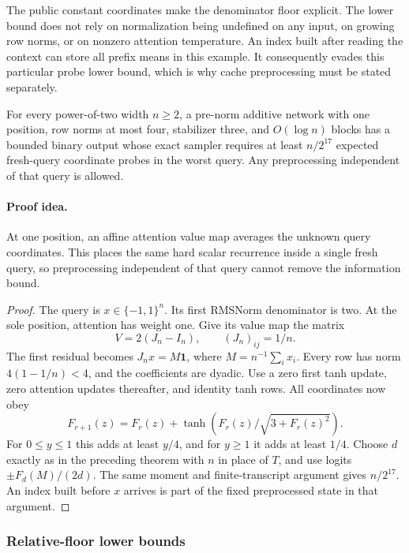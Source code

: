 The public constant coordinates make the denominator floor explicit.
The lower bound does not rely on normalization being undefined on any
input, on growing row norms, or on nonzero attention temperature. An
index built after reading the context can store all prefix means in this
example. It consequently evades this particular probe lower bound,
which is why cache preprocessing must be stated separately.


\begin{corollary}
\label{cor:pn-fresh-query}
For every power-of-two width $n\ge2$, a pre-norm additive network with
one position, row norms at most four, stabilizer three, and
$O(\log n)$ blocks has a bounded binary output whose exact sampler
requires at least $n/2^{17}$ expected fresh-query coordinate probes in
the worst query. Any preprocessing independent of that query is allowed.
\end{corollary}
\paragraph{Proof idea.}
At one position, an affine attention value map averages the unknown
query coordinates. This places the same hard scalar recurrence inside a
single fresh query, so preprocessing independent of that query cannot
remove the information bound.

\begin{proof}
The query is $x\in\{-1,1\}^n$. Its first RMSNorm denominator is two.
At the sole position, attention has weight one. Give its value map the
matrix
\[
 V=2(J_n-I_n),\qquad (J_n)_{ij}=1/n.
\]
The first residual becomes $J_nx=M\boldsymbol1$, where
$M=n^{-1}\sum_i x_i$. Every row has norm $4(1-1/n)<4$, and the
coefficients are dyadic. Use a zero first tanh update, zero attention
updates thereafter, and identity tanh rows. All coordinates now obey
\[
 F_{r+1}(z)=F_r(z)+\tanh(F_r(z)/\sqrt{3+F_r(z)^2}).
\]
For $0\le y\le1$ this adds at least $y/4$, and for $y\ge1$ it adds at
least $1/4$. Choose $d$ exactly as in the preceding theorem with $n$ in
place of $T$, and use logits $\pm F_d(M)/(2d)$. The same moment and
finite-transcript argument gives $n/2^{17}$. An index built before $x$
arrives is part of the fixed preprocessed state in that argument.
\end{proof}

\subsubsection{Relative-floor lower bounds}

